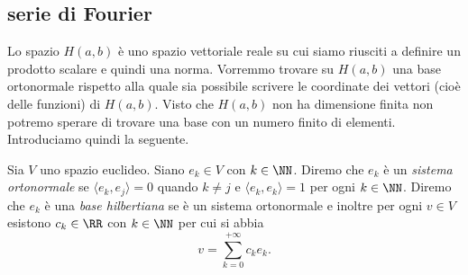 \subsection{serie di Fourier}
%
%

Lo spazio $H(a,b)$ è uno spazio vettoriale reale su cui siamo riusciti a definire
un prodotto scalare e quindi una norma. Vorremmo trovare su $H(a,b)$ una base
ortonormale rispetto alla quale sia possibile scrivere le coordinate dei vettori
(cioè delle funzioni) di $H(a,b)$. Visto che $H(a,b)$ non ha dimensione finita
non potremo sperare di trovare una base con un numero finito di elementi.
Introduciamo quindi la seguente.

\begin{definition}
Sia $V$ uno spazio euclideo. Siano $e_k\in V$ con $k\in \NN$. Diremo che
$e_k$ è un \emph{sistema ortonormale}%
 se $\langle e_k, e_j\rangle = 0$ quando
$k\neq j$ e $\langle e_k, e_k\rangle = 1$ per ogni $k\in \NN$.
Diremo che $e_k$ è una \emph{base hilbertiana}%
 se è un sistema ortonormale
e inoltre per ogni $v\in V$
esistono $c_k\in \RR$ con $k\in\NN$ per cui si abbia
\begin{equation}\label{eq:49346}
  v = \sum_{k=0}^{+\infty} c_k e_k.
\end{equation}
\end{definition}

